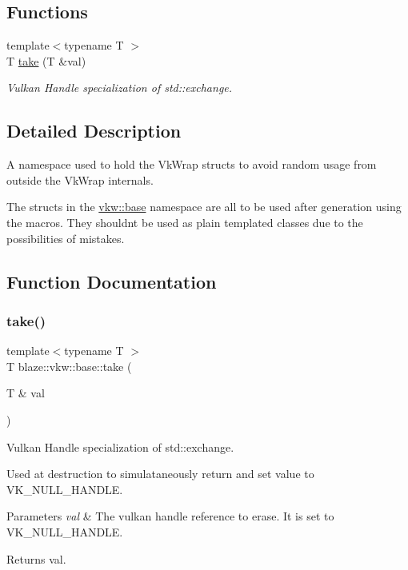 \subsection*{Functions}
\begin{DoxyCompactItemize}
\item 
{\footnotesize template$<$typename T $>$ }\\T \hyperlink{namespaceblaze_1_1vkw_1_1base_a2ea32ad0ec012f75773fcc6a4eb4bbfb}{take} (T \&val)
\begin{DoxyCompactList}\small\item\em Vulkan Handle specialization of std\+::exchange. \end{DoxyCompactList}\end{DoxyCompactItemize}


\subsection{Detailed Description}
A namespace used to hold the Vk\+Wrap structs to avoid random usage from outside the Vk\+Wrap internals. 

The structs in the \hyperlink{namespaceblaze_1_1vkw_1_1base}{vkw\+::base} namespace are all to be used after generation using the macros. They shouldn\textquotesingle{}t be used as plain templated classes due to the possibilities of mistakes. 

\subsection{Function Documentation}
\mbox{\label{namespaceblaze_1_1vkw_1_1base_a2ea32ad0ec012f75773fcc6a4eb4bbfb}} 
\subsubsection{\texorpdfstring{take()}{take()}}
{\footnotesize\ttfamily template$<$typename T $>$ \\
T blaze\+::vkw\+::base\+::take (\begin{DoxyParamCaption}\item[{T \&}]{val }\end{DoxyParamCaption})}



Vulkan Handle specialization of std\+::exchange. 

Used at destruction to simulataneously return and set value to V\+K\+\_\+\+N\+U\+L\+L\+\_\+\+H\+A\+N\+D\+LE.


\begin{DoxyParams}{Parameters}
{\em val} & The vulkan handle reference to erase. It is set to V\+K\+\_\+\+N\+U\+L\+L\+\_\+\+H\+A\+N\+D\+LE.\\
\hline
\end{DoxyParams}
\begin{DoxyReturn}{Returns}
val. 
\end{DoxyReturn}
